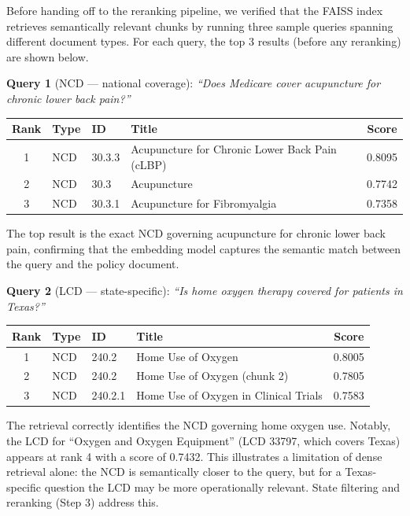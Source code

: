 \documentclass[10pt, letterpaper]{article}
\begin{document}
Before handing off to the reranking pipeline, we verified that the FAISS index
retrieves semantically relevant chunks by running three sample queries spanning
different document types. For each query, the top 3 results (before any reranking)
are shown below.

\textbf{Query 1} (NCD --- national coverage): \textit{``Does Medicare cover acupuncture
for chronic lower back pain?''}

\begin{table}[h]
\centering
\small
\begin{tabular}{@{}clllc@{}}
\toprule
\textbf{Rank} & \textbf{Type} & \textbf{ID} & \textbf{Title} & \textbf{Score} \\
\midrule
1 & NCD & 30.3.3 & Acupuncture for Chronic Lower Back Pain (cLBP) & 0.8095 \\
2 & NCD & 30.3   & Acupuncture                                    & 0.7742 \\
3 & NCD & 30.3.1 & Acupuncture for Fibromyalgia                   & 0.7358 \\
\bottomrule
\end{tabular}
\end{table}

The top result is the exact NCD governing acupuncture for chronic lower back pain,
confirming that the embedding model captures the semantic match between the query
and the policy document.

\textbf{Query 2} (LCD --- state-specific): \textit{``Is home oxygen therapy covered
for patients in Texas?''}

\begin{table}[h]
\centering
\small
\begin{tabular}{@{}clllc@{}}
\toprule
\textbf{Rank} & \textbf{Type} & \textbf{ID} & \textbf{Title} & \textbf{Score} \\
\midrule
1 & NCD & 240.2   & Home Use of Oxygen                    & 0.8005 \\
2 & NCD & 240.2   & Home Use of Oxygen (chunk 2)          & 0.7805 \\
3 & NCD & 240.2.1 & Home Use of Oxygen in Clinical Trials & 0.7583 \\
\bottomrule
\end{tabular}
\end{table}

The retrieval correctly identifies the NCD governing home oxygen use. Notably, the
LCD for ``Oxygen and Oxygen Equipment'' (LCD 33797, which covers Texas) appears at
rank 4 with a score of 0.7432. This illustrates a limitation of dense retrieval alone:
the NCD is semantically closer to the query, but for a Texas-specific question the LCD
may be more operationally relevant. State filtering and reranking (Step 3) address this.
\end{document}
